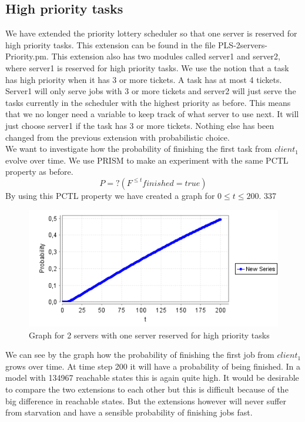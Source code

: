 \documentclass[12pt]{report}
\begin{document}
\subsection*{High priority tasks}
We have extended the priority lottery scheduler so that one server is reserved for high priority tasks. This extension can be found in the file PLS-2servers-
Priority.pm. This extension also has two modules called server1 and server2, where server1 is reserved for high priority tasks. We use the notion that a task has high priority when it has 3 or more tickets. A task has at most 4 tickets. Server1 will only serve jobs with 3 or more tickets and server2 will just serve the tasks currently in the scheduler with the highest priority as before. This means that we no longer need a variable to keep track of what server to use next. It will just choose server1 if the task has 3 or more tickets. Nothing else has been changed from the previous extension with probabilistic choice. 
\\
We want to investigate how the probability of finishing the first task from $client_1$ evolve over time. We use PRISM to make an experiment with the same PCTL property as before.
$$P=? ( F^{\leq t} finished=true)$$
By using this PCTL property we have created a graph for $0 \leq t \leq 200$. 337
\begin{figure}[H]
	\begin{center}
		\includegraphics[scale=0.75]{../GFX/C2.png}
	\end{center}
	\caption{Graph for 2 servers with one server reserved for high priority tasks}
\end{figure}
We can see by the graph how the probability of finishing the first job from $client_1$ grows over time. At time step 200 it will have a probability of being finished. In a model with 134967 reachable states this is again quite high. It would be desirable to compare the two extensions to each other but this is difficult because of the big difference in reachable states. But the extensions however will never suffer from starvation and have a sensible probability of finishing jobs fast.
\end{document}
